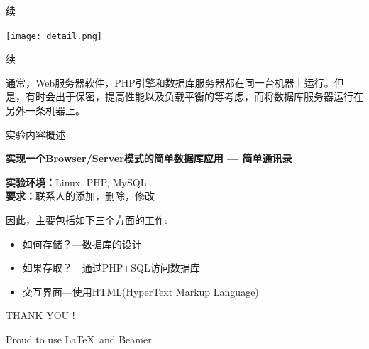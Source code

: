 \documentclass[CJK]{beamer}
\begin{document}
\begin{CJK*}{UTF8}{gbsn}
\begin{frame}{续}
\begin{center}
	\texttt{[image: detail.png]}
\end{center}
\end{frame}
\begin{frame}{续}
\begin{block}{}
通常，Web服务器软件，PHP引擎和数据库服务器都在同一台机器上运行。但是，有时会出于保密，提高性能以及负载平衡的等考虑，而将数据库服务器运行在另外一条机器上。
\end{block}
\end{frame}
\begin{frame}{实验内容概述}
\begin{block}{}
{\bf	实现一个Browser/Server模式的简单数据库应用 --- 简单通讯录}
\end{block}
\begin{block}{}
{\bf 实验环境：}Linux, PHP, MySQL\\
{\bf 要求：}联系人的添加，删除，修改
\end{block}
因此，主要包括如下三个方面的工作:
\begin{block}{}
	\begin{itemize}
		\item 如何存储？---数据库的设计
		\item 如果存取？---通过PHP+SQL访问数据库
		\item 交互界面---使用HTML(HyperText Markup Language)
	\end{itemize}
\end{block}
\end{frame}

\begin{frame}
	\begin{center}
	{\LARGE THANK YOU !}
	\end{center}
	\begin{block}{}
	\begin{center}
	{\small Proud to use \LaTeX\ and Beamer.}
	\end{center}
	\end{block}
\end{frame}

\end{CJK*}
\end{document}

